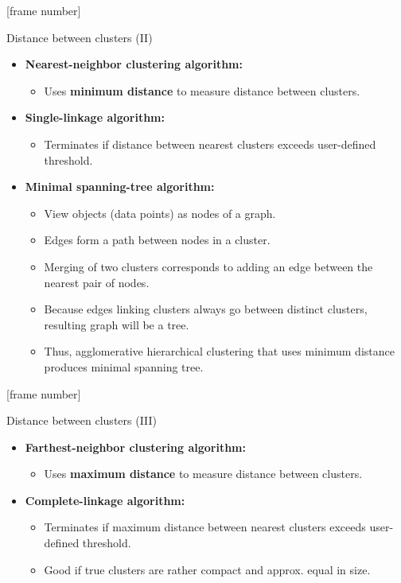\documentclass[aspectratio=169,t,xcolor=dvipsnames]{beamer}
\begin{document}
  { %
    [frame number]
    \begin{frame}{Distance between clusters (II)}
      \begin{itemize}
        \item \textbf{Nearest-neighbor clustering algorithm:}
        \begin{itemize}
          \item Uses \textbf{\color{airforceblue}minimum distance} to measure distance between clusters.
        \end{itemize}
        \item \textbf{Single-linkage algorithm:}
        \begin{itemize}
          \item Terminates if distance between nearest clusters exceeds user-defined threshold.
        \end{itemize}
        \item \textbf{Minimal spanning-tree algorithm:}
        \begin{itemize}
          \item View objects (data points) as nodes of a graph.
          \item Edges form a path between nodes in a cluster.
          \item Merging of two clusters corresponds to adding an edge between the nearest pair of nodes.
          \item Because edges linking clusters always go between distinct clusters,\\
          resulting graph will be a tree.
          \item Thus, agglomerative hierarchical clustering that uses minimum distance produces minimal spanning tree.
        \end{itemize}
      \end{itemize}
    \end{frame}
  }

  { %
    [frame number]
    \begin{frame}{Distance between clusters (III)}
      \begin{itemize}
        \item \textbf{Farthest-neighbor clustering algorithm:}
        \begin{itemize}
          \item Uses \textbf{\color{airforceblue}maximum distance} to measure distance between clusters.
        \end{itemize}
        \item \textbf{Complete-linkage algorithm:}
        \begin{itemize}
          \item Terminates if maximum distance between nearest clusters exceeds user-defined threshold.
          \item Good if true clusters are rather compact and approx. equal in size.
        \end{itemize}
      \end{itemize}
    \end{frame}
  }
\end{document}
